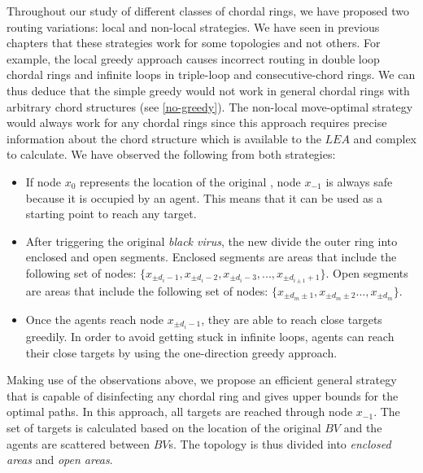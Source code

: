 Throughout our study of different classes of chordal rings, we have proposed two routing variations: local and non-local strategies. We have seen in previous chapters that these strategies work for some topologies and not others. For example, the local greedy approach causes incorrect routing in double loop chordal rings and infinite loops in triple-loop and consecutive-chord rings. We can thus deduce that the simple greedy would not work in general chordal rings with arbitrary chord structures (see \ref{no-greedy}). The non-local move-optimal strategy would always work for any chordal rings since this approach requires precise information about the chord structure which is available to the $LEA$ and complex  to calculate. We have observed the following from both strategies:

\begin{itemize}
\item  If node $x_{0}$ represents the location of the original \bv, node $x_{-1}$ is always safe because it is occupied by an agent. This means that it can be used as a starting point to reach any target.
\item After triggering the original {\it black virus}, the new \bvs divide the outer ring into enclosed and open segments. Enclosed segments are areas that include the following set of nodes: $\{ x_{\pm d_i-1}, x_{\pm d_i-2}, x_{\pm d_i-3},..., x_{\pm d_{i\pm1}+1}\}$. Open segments are areas that include the following set of nodes: $\{ x_{\pm d_m\pm1},  x_{\pm d_m\pm2}..., x_{\pm d_m}\}$.
\item Once the agents reach node $x_{\pm d_i-1}$, they are able to reach close targets greedily. In order to avoid getting stuck in infinite loops, agents can reach their close targets by using the one-direction greedy approach. 
\end{itemize} 

Making use of the observations above, we propose an efficient general strategy that is capable of disinfecting any chordal ring and gives upper bounds for the optimal paths.
In this approach, all targets are reached through node $x_{-1}$. The set of targets is calculated based on the location of the original $BV$ and the agents are scattered between $BV$s. The topology is thus divided into {\it enclosed areas} and {\it open areas}.



